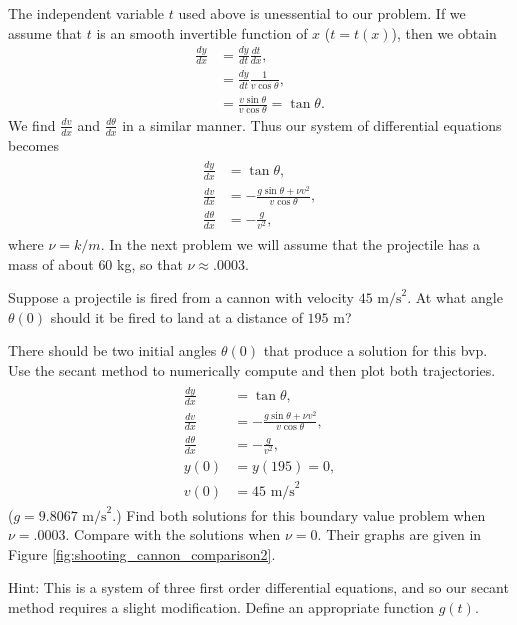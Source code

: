 The independent variable $t$ used above is unessential to our problem.
If we assume that $t$ is an smooth invertible function of $x$ ($t = t(x)$), then we obtain
\begin{align*}
\frac{dy}{dx} &= \frac{dy}{dt}\frac{dt}{dx} ,\\
&= \frac{dy}{dt} \frac{1}{v\cos{\theta}}, \\
&= \frac{v \sin{\theta}}{v\cos{\theta}} = \tan{\theta}.
\end{align*}
We find $\frac{dv}{dx}$ and $\frac{d\theta}{dx}$ in a similar manner.
Thus our system of differential equations becomes
\begin{align}
	\begin{split}
\frac{dy}{dx} &= \tan {\theta} ,\\
\frac{dv}{dx} &= -\frac{g \sin{\theta} + \nu v^2}{v \cos{\theta}},\\
\frac{d\theta}{dx} &= -\frac{g}{v^2}, \label{eqn:cannon_DEs}
	\end{split}
\end{align}
where $\nu = k/m.$
In the next problem we will assume that the projectile has a mass of about $60$ kg, so that $\nu \approx .0003$.

\begin{problem}
Suppose a projectile is fired from a cannon with velocity $45\text{ m/s}^2$.
At what angle $\theta(0)$ should it be fired to land at a distance of $195\text{ m}$?

There should be two initial angles $\theta(0)$ that produce a solution for this bvp.
Use the secant method to numerically compute and then plot both trajectories.
\begin{align}
	\label{eqn:cannon_shooting}
	\begin{split}
\frac{dy}{dx} &= \tan {\theta} ,\\
\frac{dv}{dx} &= -\frac{g \sin{\theta} + \nu v^2}{v \cos{\theta}},\\
\frac{d\theta}{dx} &= -\frac{g}{v^2},\\
y(0)&= y(195) = 0,\\
v(0) &= 45 \text{ m/s}^2
	\end{split}
\end{align}
($g = 9.8067\text{ m/s}^2$.)
Find both solutions for this boundary value problem when $\nu = .0003$.
Compare with the solutions when $\nu = 0.$
Their graphs are given in Figure \ref{fig:shooting_cannon_comparison2}.

Hint: This is a system of three first order differential equations, and so our secant method requires a slight modification.
Define an appropriate function $g(t)$.
\end{problem}


